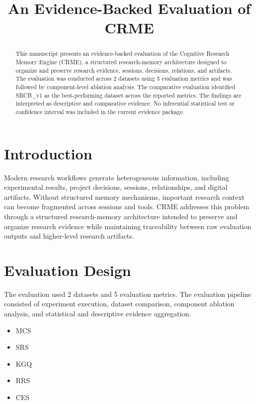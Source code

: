 \documentclass[11pt]{article}
\title{An Evidence-Backed Evaluation of CRME}
\author{}
\date{}
\begin{document}
\maketitle

\begin{abstract}
This manuscript presents an evidence-backed evaluation of the Cognitive Research Memory Engine (CRME), a structured research-memory architecture designed to organize and preserve research evidence, sessions, decisions, relations, and artifacts.
The evaluation was conducted across 2 datasets using 5 evaluation metrics and was followed by component-level ablation analysis.
The comparative evaluation identified SRCB\_v1 as the best-performing dataset across the reported metrics.
The findings are interpreted as descriptive and comparative evidence. No inferential statistical test or confidence interval was included in the current evidence package.
\end{abstract}

\section{Introduction}
Modern research workflows generate heterogeneous information, including experimental results, project decisions, sessions, relationships, and digital artifacts.
Without structured memory mechanisms, important research context can become fragmented across sessions and tools.
CRME addresses this problem through a structured research-memory architecture intended to preserve and organize research evidence while maintaining traceability between raw evaluation outputs and higher-level research artifacts.

\section{Evaluation Design}
The evaluation used 2 datasets and 5 evaluation metrics.
The evaluation pipeline consisted of experiment execution, dataset comparison, component ablation analysis, and statistical and descriptive evidence aggregation.

\begin{itemize}
\item MCS
\item SRS
\item KGQ
\item RRS
\item CES
\end{itemize}
\end{document}
